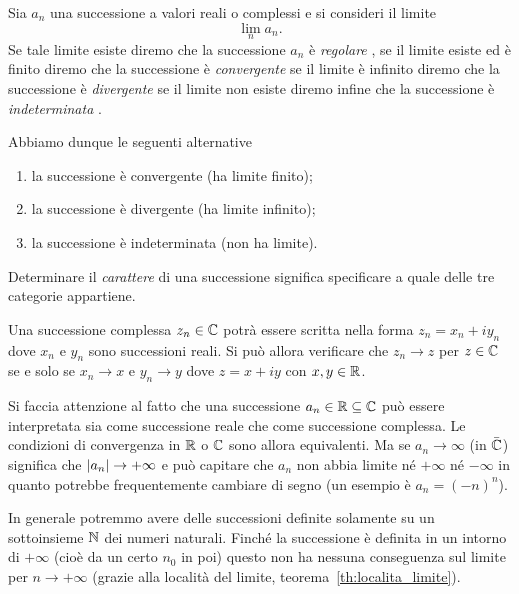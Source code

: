 \begin{definition}
Sia $a_n$ una successione a valori reali o complessi
e si consideri il limite 
\[
  \lim_n a_n.  
\]
Se tale limite esiste diremo che la successione $a_n$ è 
\emph{regolare}%
%
,
%
se il limite esiste ed è finito diremo che la successione è 
\emph{convergente}%
%
%
se il limite è infinito diremo che la successione è 
\emph{divergente}%
%
%
se il limite non esiste diremo infine che la successione è
\emph{indeterminata}%
%
%
.

Abbiamo dunque le seguenti alternative
\begin{enumerate}
 \item la successione è convergente (ha limite finito);
 \item la successione è divergente (ha limite infinito);
 \item la successione è indeterminata (non ha limite).
\end{enumerate}
Determinare il \emph{carattere}
%
%
%
di una successione
significa specificare a quale delle tre categorie appartiene.
\end{definition}

\begin{exercise}
Una successione complessa $z_n\in {\mathbb C}$ potrà essere scritta
nella forma $z_n = x_n + i y_n$ dove $x_n$ e $y_n$ sono successioni
reali. Si può allora verificare che $z_n\to z$ per $z\in {\mathbb C}$ se e solo se
$x_n\to x$ e $y_n\to y$ dove $z=x+ iy$ con $x,y\in {\mathbb R}$.
\end{exercise}

Si faccia attenzione al fatto che una successione $a_n\in {\mathbb R} \subseteq {\mathbb C}$
può essere interpretata sia come successione reale che come successione complessa.
Le condizioni di convergenza in ${\mathbb R}$ o ${\mathbb C}$ sono allora equivalenti. Ma
se $a_n \to \infty$ (in $\bar {{\mathbb C}}$) significa che ${\left|a_n\right|}\to +\infty$
e può capitare che $a_n$ non abbia limite né $+\infty$
né $-\infty$ in quanto potrebbe frequentemente cambiare di segno
(un esempio è $a_n = (-n)^n$).

In generale potremmo avere delle successioni definite solamente 
su un sottoinsieme ${\mathbb N}$ dei numeri naturali. 
Finché la successione è definita in un intorno di $+\infty$ (cioè 
da un certo $n_0$ in poi) questo non ha nessuna conseguenza sul 
limite per $n\to +\infty$ (grazie alla località del limite, 
teorema~\ref{th:localita_limite}).

